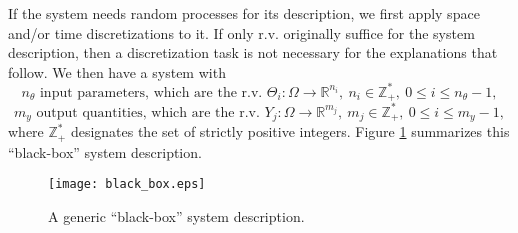 If the system needs random processes for its description, we first apply space and/or time discretizations to it. 
If only r.v. originally suffice for the system description, then a discretization task is not necessary for the explanations that follow.
We then have a system with
\begin{equation}\label{eq-n-theta}
n_{\theta}\mbox{ input parameters, which are the r.v. }\Theta_i:\Omega\rightarrow\mathbb{R}^{n_i},~n_i\in\mathbb{Z}_+^*,~0\leqslant i\leqslant n_{\theta}-1,
\end{equation}
\begin{equation}\label{eq-m-y}
m_{y}\mbox{ output quantities, which are the r.v. }Y_j:\Omega\rightarrow\mathbb{R}^{m_j},~m_j\in\mathbb{Z}_+^*,~0\leqslant i\leqslant m_{y}-1,
\end{equation}
where $\mathbb{Z}_+^*$ designates the set of strictly positive integers.
Figure \ref{fig-black-box} summarizes this ``black-box'' system description.

\begin{figure}%
\begin{center}
\texttt{[image: black\_box.eps]}
\end{center}
\caption{A generic ``black-box'' system description.
}
\label{fig-black-box}
\end{figure}

